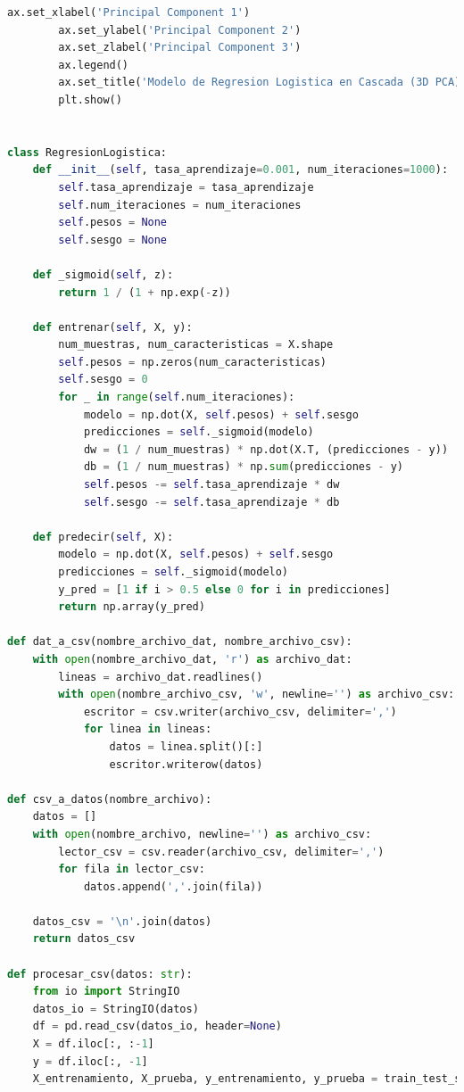 \documentclass[12pt]{article}
\begin{document}
\begin{lstlisting}[language=Python]
        ax.set_xlabel('Principal Component 1')
        ax.set_ylabel('Principal Component 2')
        ax.set_zlabel('Principal Component 3')
        ax.legend()
        ax.set_title('Modelo de Regresion Logistica en Cascada (3D PCA)')
        plt.show()


class RegresionLogistica:
    def __init__(self, tasa_aprendizaje=0.001, num_iteraciones=1000):
        self.tasa_aprendizaje = tasa_aprendizaje
        self.num_iteraciones = num_iteraciones
        self.pesos = None
        self.sesgo = None

    def _sigmoid(self, z):
        return 1 / (1 + np.exp(-z))

    def entrenar(self, X, y):
        num_muestras, num_caracteristicas = X.shape
        self.pesos = np.zeros(num_caracteristicas)
        self.sesgo = 0
        for _ in range(self.num_iteraciones):
            modelo = np.dot(X, self.pesos) + self.sesgo
            predicciones = self._sigmoid(modelo)
            dw = (1 / num_muestras) * np.dot(X.T, (predicciones - y))
            db = (1 / num_muestras) * np.sum(predicciones - y)
            self.pesos -= self.tasa_aprendizaje * dw
            self.sesgo -= self.tasa_aprendizaje * db

    def predecir(self, X):
        modelo = np.dot(X, self.pesos) + self.sesgo
        predicciones = self._sigmoid(modelo)
        y_pred = [1 if i > 0.5 else 0 for i in predicciones]
        return np.array(y_pred)

def dat_a_csv(nombre_archivo_dat, nombre_archivo_csv):
    with open(nombre_archivo_dat, 'r') as archivo_dat:
        lineas = archivo_dat.readlines()
        with open(nombre_archivo_csv, 'w', newline='') as archivo_csv:
            escritor = csv.writer(archivo_csv, delimiter=',')
            for linea in lineas:
                datos = linea.split()[:]
                escritor.writerow(datos)

def csv_a_datos(nombre_archivo):
    datos = []
    with open(nombre_archivo, newline='') as archivo_csv:
        lector_csv = csv.reader(archivo_csv, delimiter=',')
        for fila in lector_csv:
            datos.append(','.join(fila))

    datos_csv = '\n'.join(datos)
    return datos_csv

def procesar_csv(datos: str):
    from io import StringIO
    datos_io = StringIO(datos)
    df = pd.read_csv(datos_io, header=None)
    X = df.iloc[:, :-1]
    y = df.iloc[:, -1]
    X_entrenamiento, X_prueba, y_entrenamiento, y_prueba = train_test_split(X, y, test_size=0.2, random_state=42)


\end{lstlisting}
\end{document}
